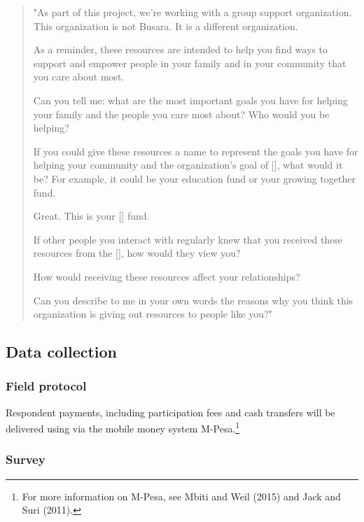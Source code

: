 \documentclass[11pt, a4paper]{article}\usepackage[]{graphicx}\usepackage[]{color}
\begin{document}
            \begin{quote}

                "As part of this project, we're working with a group support organization. This organization is not Busara. It is a different organization.

                As a reminder, these resources are intended to help you find ways to support and empower people in your family and in your community that you care about most.

                Can you tell me: what are the most important goals you have for helping your family and the people you care most about? Who would you be helping?

                If you could give these resources a name to represent the goals you have for helping your community and the organization's goal of [], what would it be? For example, it could be your education fund or your growing together fund.

                Great. This is your [] fund.

                If other people you interact with regularly knew that you received these resources from the [], how would they view you?

                How would receiving these resources affect your relationships?

                Can you describe to me in your own words the reasons why you think this organization is giving out resources to people like you?"

            \end{quote}

    \subsection{Data collection}

        \subsubsection{Field protocol}

            Respondent payments, including participation fees and cash transfers will be delivered using via the mobile money system M-Pesa.\footnote{For more information on M-Pesa, see Mbiti and Weil (2015) and Jack and Suri (2011).}

        \subsubsection{Survey}
\end{document}

